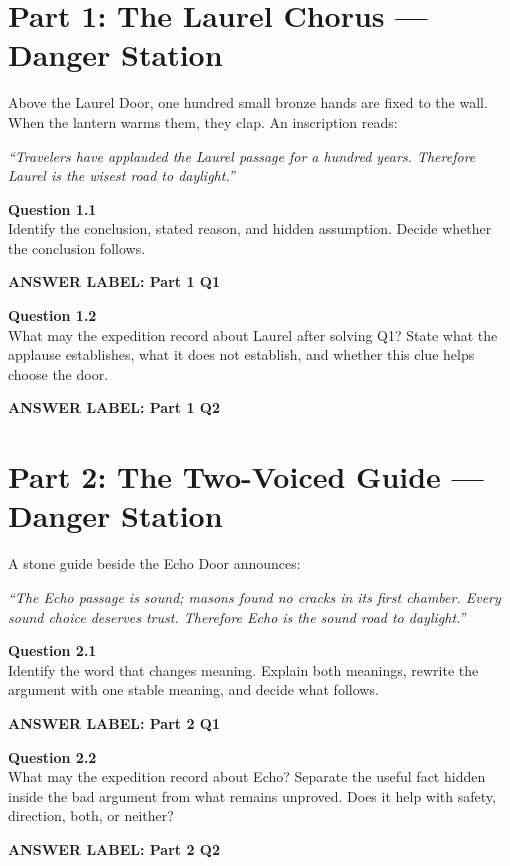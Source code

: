 \documentclass[12pt]{article}
\newcommand{\answerbox}[2]{%
\vspace{0.12em}\noindent\textbf{#1}\par\vspace{0.04em}
\noindent\fbox{\begin{minipage}[t][#2]{\dimexpr\textwidth-2\fboxsep-2\fboxrule}\rule{\textwidth}{0pt}\vspace{#2}\end{minipage}}\par\vspace{0.22em}}
\newcommand{\cluebox}[1]{%
\par\vspace{0.12em}\noindent\begin{minipage}{\textwidth}\itshape #1\end{minipage}\par\vspace{0.12em}}
\begin{document}
\newpage

\section*{Part 1: The Laurel Chorus --- Danger Station}

Above the Laurel Door, one hundred small bronze hands are fixed to the wall. When the lantern warms them, they clap. An inscription reads:

\cluebox{``Travelers have applauded the Laurel passage for a hundred years. Therefore Laurel is the wisest road to daylight.''}

\textbf{Question 1.1}\\[-0.15em]
Identify the conclusion, stated reason, and hidden assumption. Decide whether the conclusion follows.

\answerbox{ANSWER LABEL: Part 1 Q1}{2.25in}

\textbf{Question 1.2}\\[-0.15em]
What may the expedition record about Laurel after solving Q1? State what the applause establishes, what it does not establish, and whether this clue helps choose the door.

\answerbox{ANSWER LABEL: Part 1 Q2}{2.05in}

\newpage

\section*{Part 2: The Two-Voiced Guide --- Danger Station}

A stone guide beside the Echo Door announces:

\cluebox{``The Echo passage is sound; masons found no cracks in its first chamber. Every sound choice deserves trust. Therefore Echo is the sound road to daylight.''}

\textbf{Question 2.1}\\[-0.15em]
Identify the word that changes meaning. Explain both meanings, rewrite the argument with one stable meaning, and decide what follows.

\answerbox{ANSWER LABEL: Part 2 Q1}{2.45in}

\textbf{Question 2.2}\\[-0.15em]
What may the expedition record about Echo? Separate the useful fact hidden inside the bad argument from what remains unproved. Does it help with safety, direction, both, or neither?

\answerbox{ANSWER LABEL: Part 2 Q2}{1.85in}
\end{document}
